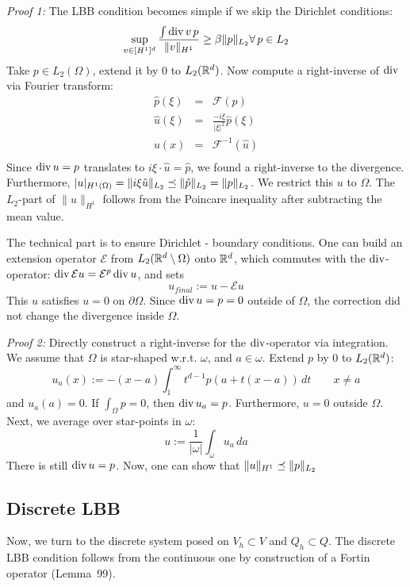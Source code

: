 {\em Proof 1: } The LBB condition becomes simple if we skip the Dirichlet conditions:
$$
\sup_{v \in [H^1]^d} \frac { \int \operatorname{div} v \, p}  { \| v \|_{H^1}} \geq \beta \| p \|_{L_2}
\forall \, p \in L_2
$$
Take $p \in L_2(\Omega)$, extend it by $0$ to $L_2 ({\mathbb R}^d)$. Now compute a right-inverse of $\operatorname{div}$ via Fourier transform:
\begin{eqnarray*}
\hat p(\xi) & = & {\mathcal F} (p) \\
\hat u(\xi) & = & \frac{-i\xi}{|\xi|^2} \hat p(\xi) \\
u(x) & = & {\mathcal F}^{-1} (\hat u ) \\
\end{eqnarray*}
Since $\operatorname{div} u = p$ translates to $i \xi \cdot \hat u = \hat p$, we
found a right-inverse to the divergence. Furthermore, $| u
|_{H^1(\Omega)} = \| i \xi \hat u\|_{L_2} \preceq \| \hat p \|_{L_2} =
\| p \|_{L_2}$. We restrict this $u$ to $\Omega$. 
The $L_2$-part of $\| u \|_{H^1}$ follows from the
Poincare inequality after subtracting the mean value. 

The technical part is to ensure Dirichlet - boundary conditions. One can build an extension operator ${\mathcal E}$ from $L_2({\mathbb R}^d \setminus \Omega)$ onto ${\mathbb R}^d$, which commutes with the $\operatorname{div}$-operator: $\operatorname{div} {\mathcal E} u = {\mathcal E}^p \operatorname{div} u$, and sets
$$
u_{final} := u - {\mathcal E} u
$$
This $u$ satisfies $u = 0$ on $\partial \Omega$. Since $\operatorname{div} u = p = 0$ outside of $\Omega$, the correction did not change the divergence inside $\Omega$.

{\em Proof 2: } Directly construct a right-inverse for the $\operatorname{div}$-operator via integration. We assume that $\Omega$ is star-shaped w.r.t. $\omega$, and $a\in \omega$. Extend $p$ by $0$ to $L_2({\mathbb R}^d)$:
$$
u_a(x) := -(x-a) \int_1^\infty  t^{d-1} p(a + t(x-a)) \, dt\qquad x
\neq a
$$
and $u_a(a) = 0$.
If $\int_\Omega p = 0$, then $\operatorname{div} u_a = p$. Furthermore, $u = 0$ outside $\Omega$.
Next, we average over star-points in $\omega$:
$$
u := \frac{1}{|\omega|}  \int_\omega u_a \, da
$$
There is still $\operatorname{div} u = p$. Now, one can show that $\| u \|_{H^1} \preceq \| p \|_{L_2}$

\subsection{Discrete LBB}

Now, we turn to the discrete system posed on $V_h \subset V$ and $Q_h \subset Q$. 
The discrete LBB condition follows from the continuous one by
construction of a Fortin operator (Lemma~99).

